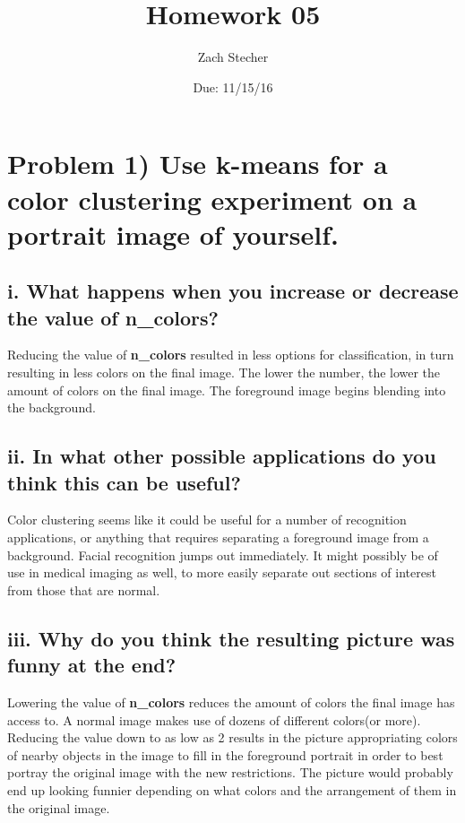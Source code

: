 \documentclass[11pt]{article}
\title{Homework 05}
\author{Zach Stecher}
\date{Due: 11/15/16}
\begin{document}
\maketitle

\section*{Problem 1) Use k-means for a color clustering experiment on a portrait image of yourself.}

\subsection*{i. What happens when you increase or decrease the value of \textbf{n\_colors?}}

Reducing the value of \textbf{n\_colors} resulted in less options for classification, in turn resulting in less colors on the final image. The lower the number, the lower the amount of colors on the final image. The foreground image begins blending into the background.

\subsection*{ii. In what other possible applications do you think this can be useful?}

Color clustering seems like it could be useful for a number of recognition applications, or anything that requires separating a foreground image from a background. Facial recognition jumps out immediately. It might possibly be of use in medical imaging as well, to more easily separate out sections of interest from those that are normal.

\subsection*{iii. Why do you think the resulting picture was funny at the end?}

Lowering the value of \textbf{n\_colors} reduces the amount of colors the final image has access to. A normal image makes use of dozens of different colors(or more). Reducing the value down to as low as 2 results in the picture appropriating colors of nearby objects in the image to fill in the foreground portrait in order to best portray the original image with the new restrictions. The picture would probably end up looking funnier depending on what colors and the arrangement of them in the original image.
\end{document}
